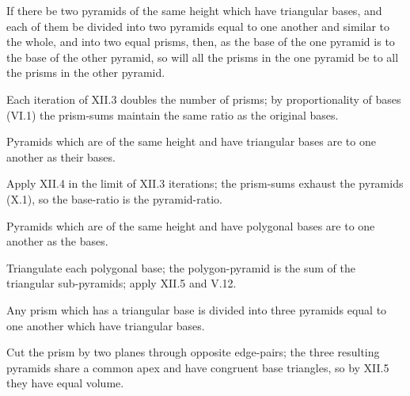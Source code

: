 \documentclass{rrxiv}
\begin{document}
\begin{claim}
\label{prop:XII.4}
If there be two pyramids of the same height which have triangular
bases, and each of them be divided into two pyramids equal to one
another and similar to the whole, and into two equal prisms, then,
as the base of the one pyramid is to the base of the other pyramid,
so will all the prisms in the one pyramid be to all the prisms in
the other pyramid.
\end{claim}
\begin{evidence}
\label{ev:XII.4}
Each iteration of XII.3 doubles the number of prisms; by
proportionality of bases (VI.1) the prism-sums maintain the same
ratio as the original bases.
\end{evidence}

\begin{claim}
\label{prop:XII.5}
Pyramids which are of the same height and have triangular bases are
to one another as their bases.
\end{claim}
\begin{evidence}
\label{ev:XII.5}
Apply XII.4 in the limit of XII.3 iterations; the prism-sums
exhaust the pyramids (X.1), so the base-ratio is the pyramid-ratio.
\end{evidence}

\begin{claim}
\label{prop:XII.6}
Pyramids which are of the same height and have polygonal bases are
to one another as the bases.
\end{claim}
\begin{evidence}
\label{ev:XII.6}
Triangulate each polygonal base; the polygon-pyramid is the sum of
the triangular sub-pyramids; apply XII.5 and V.12.
\end{evidence}

\begin{claim}
\label{prop:XII.7}
Any prism which has a triangular base is divided into three pyramids
equal to one another which have triangular bases.
\end{claim}
\begin{evidence}
\label{ev:XII.7}
Cut the prism by two planes through opposite edge-pairs; the three
resulting pyramids share a common apex and have congruent base
triangles, so by XII.5 they have equal volume.
\end{evidence}
\end{document}
